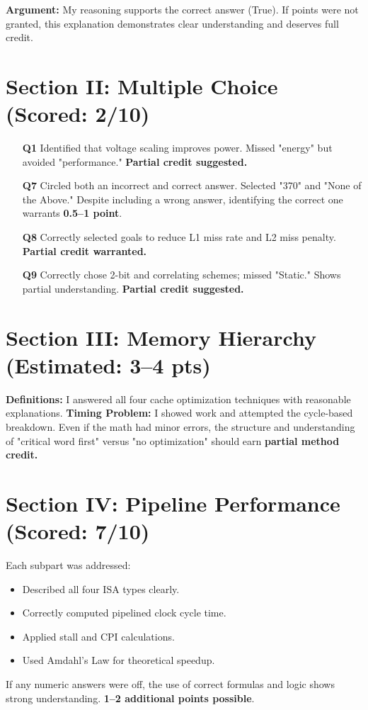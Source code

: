 \documentclass[11pt]{article}
\begin{document}
\textbf{Argument:} My reasoning supports the correct answer (True). If points were not granted, this explanation demonstrates clear understanding and deserves full credit.

\section*{Section II: Multiple Choice (Scored: 2/10)}

\begin{itemize}[leftmargin=1.5em]
  \item[\textbf{Q1}] Identified that voltage scaling improves power. Missed "energy" but avoided "performance." \textbf{Partial credit suggested.}
  \item[\textbf{Q7}] Circled both an incorrect and correct answer. Selected "370" and "None of the Above." Despite including a wrong answer, identifying the correct one warrants \textbf{0.5--1 point}.
  \item[\textbf{Q8}] Correctly selected goals to reduce L1 miss rate and L2 miss penalty. \textbf{Partial credit warranted.}
  \item[\textbf{Q9}] Correctly chose 2-bit and correlating schemes; missed "Static." Shows partial understanding. \textbf{Partial credit suggested.}
\end{itemize}

\section*{Section III: Memory Hierarchy (Estimated: 3--4 pts)}
\textbf{Definitions:} I answered all four cache optimization techniques with reasonable explanations.
\textbf{Timing Problem:} I showed work and attempted the cycle-based breakdown. Even if the math had minor errors, the structure and understanding of "critical word first" versus "no optimization" should earn \textbf{partial method credit.}

\section*{Section IV: Pipeline Performance (Scored: 7/10)}
Each subpart was addressed:
\begin{itemize}[leftmargin=1.5em]
  \item Described all four ISA types clearly.
  \item Correctly computed pipelined clock cycle time.
  \item Applied stall and CPI calculations.
  \item Used Amdahl's Law for theoretical speedup.
\end{itemize}
If any numeric answers were off, the use of correct formulas and logic shows strong understanding. \textbf{1--2 additional points possible}.
\end{document}
